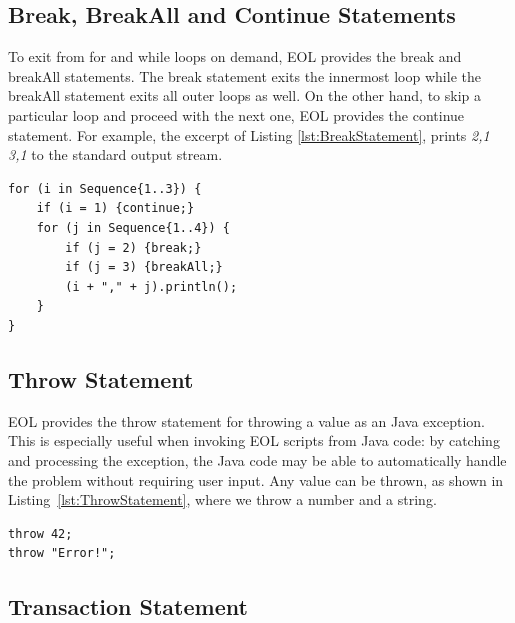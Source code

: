\subsection{Break, BreakAll and Continue Statements}

To exit from for and while loops on demand, EOL provides the break and breakAll statements. The break statement exits the innermost loop while the breakAll statement exits all outer loops as well. On the other hand, to skip a particular loop and proceed with the next one, EOL provides the continue statement. For example, the excerpt of Listing \ref{lst:BreakStatement}, prints \textit{2,1 3,1} to the standard output stream.

\begin{lstlisting}[float=h, caption=Example of the break\, breakAll and continue statements, label=lst:BreakStatement, language=EOL]
for (i in Sequence{1..3}) {
	if (i = 1) {continue;}
	for (j in Sequence{1..4}) {
		if (j = 2) {break;}
		if (j = 3) {breakAll;}
		(i + "," + j).println();
	}
}
\end{lstlisting}

\subsection{Throw Statement}
\label{sec:eol-throw}

EOL provides the throw statement for throwing a value as an  Java exception. This is especially useful when invoking EOL scripts from Java code: by catching and processing the exception, the Java code may be able to automatically handle the problem without requiring user input. Any value can be thrown, as shown in Listing~\ref{lst:ThrowStatement}, where we throw a number and a string.

\begin{lstlisting}[float=h, caption=Example of the throw statement, label=lst:ThrowStatement, language=EOL]
throw 42;
throw "Error!";
\end{lstlisting}

\subsection{Transaction Statement}

